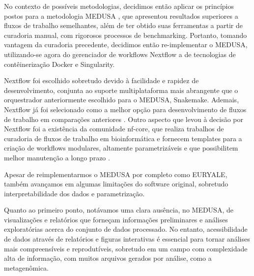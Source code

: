 \documentclass[
	12pt,				%
	oneside,			%
	a4paper,			%
	chapter=TITLE,		%
	section=TITLE,		%
	english,			%
	brazil				%
	]{abntex2}
\begin{document}
No contexto de possíveis metodologias, decidimos então aplicar os princípios postos para a metodologia MEDUSA \autocite{morais2022}, que apresentou resultados superiores a fluxos de trabalho semelhantes, além de ter obtido suas ferramentas a partir de curadoria manual, com rigorosos processos de benchmarking. Portanto, tomando vantagem da curadoria precedente, decidimos então re-implementar o MEDUSA, utilizando-se agora do gerenciador de workflows Nextflow a de tecnologias de contêinerização Docker e Singularity.

Nextflow foi escolhido sobretudo devido à facilidade e rapidez de desenvolvimento, conjunta ao suporte multiplataforma mais abrangente que o orquestrador anteriormente escolhido para o MEDUSA, Snakemake. Ademais, Nextflow já foi selecionado como a melhor opção para desenvolvimento de fluxos de trabalho em comparações anteriores \autocite{jackson2021} \autocite{celebi2023}. Outro aspecto que levou à decisão por Nextflow foi a existência da comunidade nf-core, que realiza trabalhos de curadoria de fluxos de trabalho em bioinformática e fornecem templates para a criação de workflows modulares, altamente parametrizáveis e que possibilitem melhor manutenção a longo prazo \autocite{ewels2020}.

Apesar de reimplementarmos o MEDUSA por completo como EURYALE, também avançamos em algumas limitações do software original, sobretudo interpretabilidade dos dados e parametrização.

Quanto ao primeiro ponto, notávamos uma clara ausência, no MEDUSA, de visualizações e relatórios que forneçam informações preliminares e análises exploratórias acerca do conjunto de dados processado. No entanto, acessibilidade de dados através de relatórios e figuras interativas é essencial para tornar análises mais compreensíveis e reprodutíveis, sobretudo em um campo com complexidade alta de informação, com muitos arquivos gerados por análise, como a metagenômica.
\end{document}
